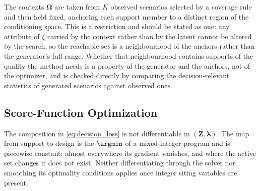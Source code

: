 The contexts $\boldsymbol{\Omega}$ are taken from $K$ observed scenarios
selected by a coverage rule and then held fixed, anchoring each support
member to a distinct region of the conditioning space. This is a
restriction and should be stated as one: any attribute of $\xi$ carried
by the context rather than by the latent cannot be altered by the search,
so the reachable set is a neighbourhood of the anchors rather than the
generator's full range. Whether that neighbourhood contains supports of
the quality the method needs is a property of the generator and the
anchors, not of the optimizer, and is checked directly by comparing the
decision-relevant statistics of generated scenarios against observed ones.

\subsection{Score-Function Optimization}
\label{sec:score_function}

The composition in \eqref{eq:decision_loss} is not differentiable in
$(\boldsymbol{Z},\boldsymbol{\lambda})$. The map from support to design
is the $\argmin$ of a mixed-integer program and is piecewise constant:
almost everywhere its gradient vanishes, and where the active set changes
it does not exist. Neither differentiating through the solver nor
smoothing its optimality conditions applies once integer siting variables
are present.

